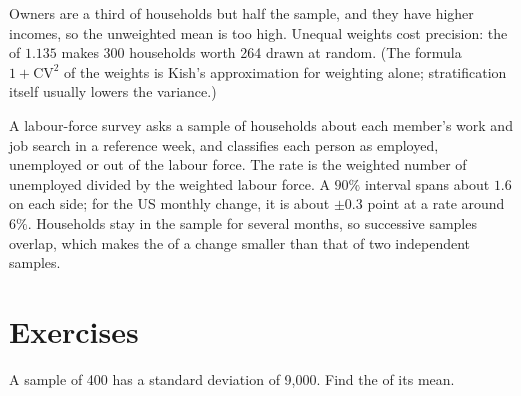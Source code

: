 \label{lst:b1:sampling-and-inference:weights}

\label{out:b1:sampling-and-inference:weights}

Owners are a third of households but half the sample, and they have higher
incomes, so the unweighted mean is too high. Unequal weights cost
precision: the  of $1.135$ makes 300 households worth 264 drawn
at random. (The formula $1 + \mathrm{CV}^2$ of the weights is Kish's approximation for
weighting alone; stratification itself usually lowers the variance.)

\begin{measure}
A labour-force survey asks a sample of households about each member's
work and job search in a reference week, and classifies each person as
employed, unemployed or out of the labour force. The rate is the weighted
number of unemployed divided by the weighted labour force. A $90\%$ interval
spans about $1.6$  on each side; for the US monthly change, it
is about $\pm 0.3$ point at a rate around $6\%$. %
Households stay in the sample for several months, so successive samples
overlap, which makes the  of a change smaller than that of
two independent samples.
\end{measure}

\label{lst:b1:sampling-and-inference:unemployment}

\label{out:b1:sampling-and-inference:unemployment}

\section*{Exercises}\label{sec:b1:sampling-and-inference:exercises}

\begin{exercise}[$\star$]\label{exo:b1:sampling-and-inference:se}
A sample of 400 has a standard deviation of 9,000. Find the 
of its mean.
\end{exercise}

